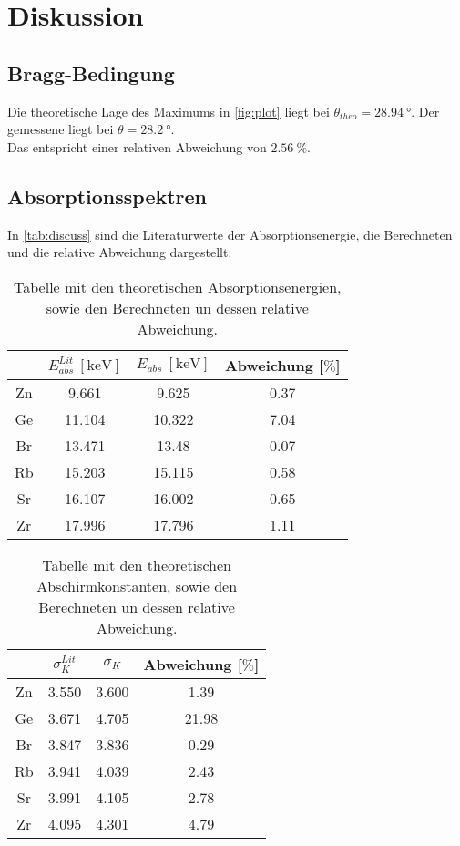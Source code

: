 \newpage
\section{Diskussion}
\label{sec:Diskussion}

\subsection{Bragg-Bedingung}
Die theoretische Lage des Maximums in \autoref{fig:plot} liegt bei $\theta_{theo} = \SI{28.94}{\degree}$.
Der gemessene liegt bei $\theta = \SI{28.2}{\degree}$.\\
Das entspricht einer relativen Abweichung von $\SI{2.56}{\percent}$.

\subsection{Absorptionsspektren}
In \autoref{tab:discuss} sind die Literaturwerte der Absorptionsenergie, die Berechneten und die relative Abweichung dargestellt.

\begin{table}
    \centering
    \caption{Tabelle mit den theoretischen Absorptionsenergien, sowie den Berechneten un dessen relative Abweichung.}
    \begin{tabular}{c c c c}
        \toprule
        $ $ & $E_{abs}^{Lit}\ [\si{\kilo\electronvolt}]$ & $E_{abs}\ [\si{\kilo\electronvolt}]$ & Abweichung [$\si{\percent}$]\\
        \midrule
        Zn & 9.661 & 9.625 & 0.37\\ \hline
        Ge & 11.104 & 10.322 & 7.04\\ \hline
        Br & 13.471 & 13.48 & 0.07\\ \hline
        Rb & 15.203 & 15.115 & 0.58\\ \hline
        Sr & 16.107 & 16.002 & 0.65\\ \hline
        Zr & 17.996 & 17.796 & 1.11\\
    \bottomrule
    \end{tabular}
    \label{tab:discuss}
\end{table}

\begin{table}
    \centering
    \caption{Tabelle mit den theoretischen Abschirmkonstanten, sowie den Berechneten un dessen relative Abweichung.}
    \begin{tabular}{c c c c}
        \toprule
        $ $ & $\sigma_K^{Lit}$ & $\sigma_K$ & Abweichung [$\si{\percent}$]\\
        \midrule
        Zn & 3.550 & 3.600 & 1.39\\ \hline
        Ge & 3.671 & 4.705 & 21.98\\ \hline
        Br & 3.847 & 3.836 & 0.29\\ \hline
        Rb & 3.941 & 4.039 & 2.43\\ \hline
        Sr & 3.991 & 4.105 & 2.78\\ \hline
        Zr & 4.095 & 4.301 & 4.79\\
    \bottomrule
    \end{tabular}
    \label{tab:discuss1}
\end{table}